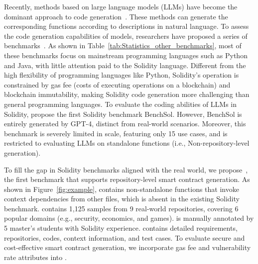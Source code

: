 Recently, methods based on large language models (LLMs) have become the dominant approach to code generation~\cite{radford2018improving,brown2020language,yu2024codereval}. 
These methods can generate the corresponding functions according to descriptions in natural language.
To assess the code generation capabilities of models, researchers have proposed a series of benchmarks~\cite{du2023classeval,yu2024codereval,li2024deveval,benchmark2024sol}.
As shown in Table~\ref{tab:Statistics_other_benchmarks}, most of these benchmarks focus on mainstream programming languages such as Python and Java, with little attention paid to the Solidity language.
Different from the high flexibility of programming languages like Python, Solidity's operation is constrained by gas fee (costs of executing operations on a blockchain) and blockchain immutability, making Solidity code generation more challenging than general programming languages.
To evaluate the coding abilities of LLMs in Solidity, \citet{benchmark2024sol} propose the first Solidity benchmark BenchSol.
However, BenchSol is entirely generated by GPT-4, distinct from real-world scenarios. 
Moreover, this benchmark is severely limited in scale, featuring only 15 use cases, and is restricted to evaluating LLMs on standalone functions (i.e., Non-repository-level generation).


To fill the gap in Solidity benchmarks aligned with the real world, we propose~\mytitle, the first benchmark that supports repository-level smart contract generation.
As shown in Figure~\ref{fig:example}, \mytitle contains non-standalone functions that invoke context dependencies from other files, which is absent in the existing Solidity benchmark.
 \mytitle contains 1,125 samples from 9 real-world repositories, covering 6 popular domains (e.g., security, economics, and games).
 \mytitle is manually annotated by 5 master's students with Solidity experience. 
\mytitle contains detailed requirements, repositories, codes, context information, and test cases.
 To evaluate secure and cost-effective smart contract generation, we incorporate gas fee and vulnerability rate attributes into \mytitle.

